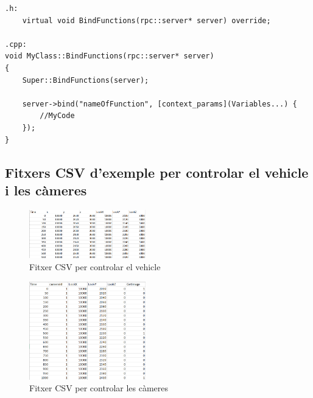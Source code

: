 \documentclass[10pt,a4paper,twocolumn,twoside]{article}
\begin{document}
\lstset{language=C} 
\begin{lstlisting}
.h:
	virtual void BindFunctions(rpc::server* server) override;
	
.cpp:
void MyClass::BindFunctions(rpc::server* server)
{
	Super::BindFunctions(server);

	server->bind("nameOfFunction", [context_params](Variables...) {
		//MyCode
	});
}

\end{lstlisting}

\subsection{Fitxers CSV d'exemple per controlar el vehicle i les càmeres}
\label{appendix:fitxerscsv}

\begin{figure}[!h]
\centering
  	\includegraphics[width=0.45\textwidth]{fitxervehicle}
	\captionsetup{labelformat=empty}
	\caption{Fitxer CSV per controlar el vehicle}
	\label{fig-fitxervehicle}
\end{figure}


\begin{figure}[!h]
\centering
  	\includegraphics[width=0.45\textwidth]{fitxercameres}
  	\captionsetup{labelformat=empty}
	\caption{Fitxer CSV per controlar les càmeres}
	\label{fig-fitxercameres}
\end{figure}
\end{document}

